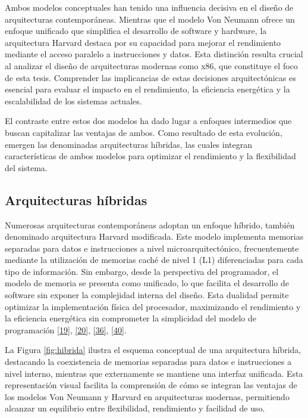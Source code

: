 \documentclass[12pt,oneside]{templates/unerthesis}
\begin{document}
Ambos modelos conceptuales han tenido una influencia decisiva en el diseño de arquitecturas contemporáneas. Mientras que el modelo Von Neumann ofrece un enfoque unificado que simplifica el desarrollo de software y hardware, la arquitectura Harvard destaca por su capacidad para mejorar el rendimiento mediante el acceso paralelo a instrucciones y datos. Esta distinción resulta crucial al analizar el diseño de arquitecturas modernas como x86, que constituye el foco de esta tesis. Comprender las implicancias de estas decisiones arquitectónicas es esencial para evaluar el impacto en el rendimiento, la eficiencia energética y la escalabilidad de los sistemas actuales.

El contraste entre estos dos modelos ha dado lugar a enfoques intermedios que buscan capitalizar las ventajas de ambos. Como resultado de esta evolución, emergen las denominadas arquitecturas híbridas, las cuales integran características de ambos modelos para optimizar el rendimiento y la flexibilidad del sistema.

\hypertarget{arquitecturas-huxedbridas}{%
\subsection{Arquitecturas híbridas}\label{arquitecturas-huxedbridas}}

Numerosas arquitecturas contemporáneas adoptan un enfoque híbrido, también denominado arquitectura Harvard modificada. Este modelo implementa memorias separadas para datos e instrucciones a nivel microarquitectónico, frecuentemente mediante la utilización de memorias caché de nivel 1 (L1) diferenciadas para cada tipo de información. Sin embargo, desde la perspectiva del programador, el modelo de memoria se presenta como unificado, lo que facilita el desarrollo de software sin exponer la complejidad interna del diseño. Esta dualidad permite optimizar la implementación física del procesador, maximizando el rendimiento y la eficiencia energética sin comprometer la simplicidad del modelo de programación \protect\hyperlink{ref-hennessy2017computer}{{[}19{]}}, \protect\hyperlink{ref-stallings_computer_2021}{{[}20{]}}, \protect\hyperlink{ref-null_essentials_2023}{{[}36{]}}, \protect\hyperlink{ref-patterson_computer_2017}{{[}40{]}}.

La Figura \ref{fig:hibrida} ilustra el esquema conceptual de una arquitectura híbrida, destacando la coexistencia de memorias separadas para datos e instrucciones a nivel interno, mientras que externamente se mantiene una interfaz unificada. Esta representación visual facilita la comprensión de cómo se integran las ventajas de los modelos Von Neumann y Harvard en arquitecturas modernas, permitiendo alcanzar un equilibrio entre flexibilidad, rendimiento y facilidad de uso.
\end{document}

